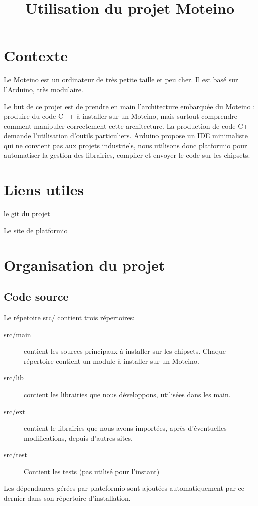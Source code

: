 \documentclass{report}
\title{Utilisation du projet Moteino}
\begin{document}
\chapter{Contexte}

Le Moteino est un ordinateur de très petite taille et peu cher. Il est basé sur l'Arduino, très modulaire. 

Le but de ce projet est de prendre en main l'architecture embarquée du Moteino : produire du code C++ à installer sur un Moteino, mais surtout comprendre comment manipuler correctement cette architecture.
La production de code C++ demande l'utilisation d'outils particuliers. Arduino propose un IDE minimaliste qui ne convient pas aux projets industriels, nous utilisons donc platformio pour automatiser la gestion des librairies, compiler et envoyer le code sur les chipsets.

\chapter{Liens utiles}

\href{https://github.com/glelouet/Moteino}{le git du projet}

\href{http://platformio.org/}{Le site de platformio}

\chapter{Organisation du projet}

\section{Code source}

Le répetoire src/ contient trois répertoires:
\begin{description}
\item[src/main] contient les sources principaux à installer sur les chipsets. Chaque répertoire contient un module à installer sur un Moteino.
\item[src/lib] contient les librairies que nous développons, utilisées dans les main.
\item[src/ext] contient le librairies que nous avons importées, après d'éventuelles modifications, depuis d'autres sites.
\item[src/test] Contient les tests (pas utilisé pour l'instant)
\end{description}

Les dépendances gérées par plateformio sont ajoutées automatiquement par ce dernier dans son répertoire d'installation.
\end{document}
